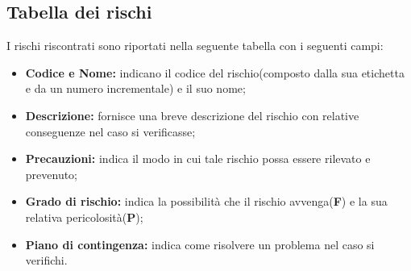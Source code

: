 \subsection{Tabella dei rischi}
I rischi riscontrati sono riportati nella seguente tabella con i seguenti campi:
\begin{itemize}
\item \textbf{Codice e Nome:} indicano il codice del rischio(composto dalla sua etichetta e da un numero incrementale) e il suo nome;
\item \textbf{Descrizione:} fornisce una breve descrizione del rischio con relative conseguenze nel caso si verificasse;
\item \textbf{Precauzioni:} indica il modo in cui tale rischio possa essere rilevato e prevenuto;
\item \textbf{Grado di rischio:} indica la possibilità che il rischio avvenga(\textbf{F}) e la sua relativa pericolosità(\textbf{P});
\item \textbf{Piano di contingenza:} indica come risolvere un problema nel caso si verifichi.
\end{itemize}


